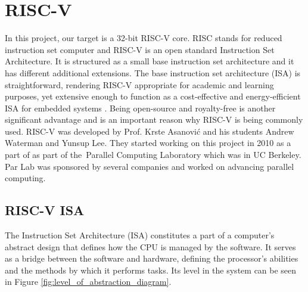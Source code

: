\clearpage
\chapter{RISC-V}\label{Ch8}
In this project, our target is a 32-bit RISC-V core. RISC stands for reduced instruction set computer and RISC-V is an open standard Instruction Set Architecture. \cite{riscvorgabout} It is structured as a small base instruction set architecture and it has different additional extensions. The base instruction set architecture (ISA) is straightforward, rendering RISC-V appropriate for academic and learning purposes, yet extensive enough to function as a cost-effective and energy-efficient ISA for embedded systems \cite{watermanriscv}. Being open-source and royalty-free is another significant advantage and is an important reason why RISC-V is being commonly used. 
RISC-V was developed by Prof. Krste Asanović and his students Andrew Waterman and Yunsup Lee. They started working on this project in 2010 as a part of as part of the Parallel Computing Laboratory which was in UC Berkeley. Par Lab was sponsored by several companies and worked on advancing parallel computing.

\section{RISC-V ISA}
The Instruction Set Architecture (ISA) constitutes a part of a computer’s abstract design that defines how the CPU is managed by the software. It serves as a bridge between the software and hardware, defining the processor’s abilities and the methods by which it performs tasks. Its level in the system can be seen in Figure \ref{fig:level_of_abstraction_diagram}.

